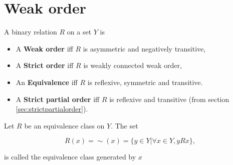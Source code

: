 \documentclass{article}
\theoremstyle{definition}
\begin{document}
\section{Weak order}

 A binary relation $R$ on a set $Y$ is
\begin{itemize}
\item A {\bf Weak order} iff $R$ is asymmetric and negatively transitive,
\item A {\bf Strict order} iff $R$ is weakly connected weak order,
\item An \textbf{Equivalence} iff $R$ is reflexive, symmetric and transitive.
\item A {\bf Strict partial order} iff $R$ is reflexive and transitive (from section \ref{sec:strictpartialorder}).
\end{itemize}

 Let $R$ be an equivalence class on $Y$. The set

\begin{equation*}
R(x)=\sim(x)=\{y\in Y| \forall x\in Y, yRx \},
\end{equation*}

is called the equivalence class generated by $x$
\end{document}
